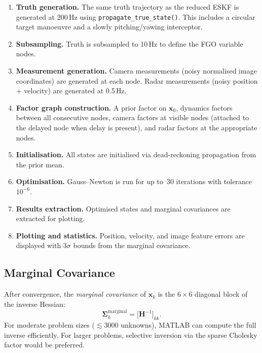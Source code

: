 \documentclass[11pt,a4paper]{article}
\newcommand{\state}{\bm{x}}
\newcommand{\hess}{\bm{H}}
\newcommand{\cov}{\bm{\Sigma}}
\begin{document}
\begin{enumerate}
  \item \textbf{Truth generation.}  The same truth trajectory as the
        reduced ESKF is generated at 200\,Hz using
        \texttt{propagate\_true\_state()}.  This includes a circular
        target manoeuvre and a slowly pitching/yawing interceptor.

  \item \textbf{Subsampling.}  Truth is subsampled to 10\,Hz to define
        the FGO variable nodes.

  \item \textbf{Measurement generation.}  Camera measurements (noisy
        normalised image coordinates) are generated at each node.  Radar
        measurements (noisy position + velocity) are generated at
        0.5\,Hz.

  \item \textbf{Factor graph construction.}  A prior factor on $\state_0$,
        dynamics factors between all consecutive nodes, camera factors at
        visible nodes (attached to the delayed node when delay is
        present), and radar factors at the appropriate nodes.

  \item \textbf{Initialisation.}  All states are initialised via
        dead-reckoning propagation from the prior mean.

  \item \textbf{Optimisation.}  Gauss--Newton is run for up to~30
        iterations with tolerance $10^{-6}$.

  \item \textbf{Results extraction.}  Optimised states and marginal
        covariances are extracted for plotting.

  \item \textbf{Plotting and statistics.}  Position, velocity, and image
        feature errors are displayed with $3\sigma$ bounds from the
        marginal covariance.
\end{enumerate}

\subsection{Marginal Covariance}
\label{sec:marginal}

After convergence, the \emph{marginal covariance} of $\state_k$ is the
$6 \times 6$ diagonal block of the inverse Hessian:
\begin{equation}
  \cov_k^{\text{marginal}} = \bigl[\hess^{-1}\bigr]_{kk}.
\end{equation}
For moderate problem sizes ($\lesssim 3000$ unknowns), MATLAB can
compute the full inverse efficiently.  For larger problems, selective
inversion via the sparse Cholesky factor would be preferred.
\end{document}
